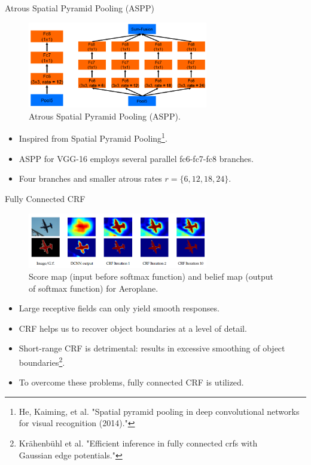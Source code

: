 \documentclass{beamer}
\begin{document}
\begin{frame}{Atrous Spatial Pyramid Pooling (ASPP)}
\vspace{-0.5cm}
\begin{figure}
	\centering
	\includegraphics[width=0.7\textwidth]{figure/ss43.png}
	\captionsetup{justification=centering}
	\caption{Atrous Spatial Pyramid Pooling (ASPP).}	
\end{figure}
\vspace{-0.4cm}
\begin{itemize}
	\item Inspired from 
	{\color{blue} Spatial Pyramid Pooling}\footnote{He, Kaiming, et al. "Spatial pyramid pooling in deep convolutional networks for visual recognition (2014)."}.
	\item<2-> ASPP for VGG-16 employs several parallel fc6-fc7-fc8 branches.
	\item<2-> Four branches and smaller atrous rates  $r=\{6,12,18,24\}$.
\end{itemize}	
\end{frame}

\begin{frame}{Fully Connected CRF}
\begin{figure}
	\centering
	\includegraphics[width=0.7\textwidth]{figure/ss26.png}
	\captionsetup{justification=centering}
	\caption{Score map (input before softmax function) and belief map (output of softmax function) for Aeroplane.}
\end{figure}
\vspace{-0.4cm}
\begin{itemize}
	\item Large receptive fields can only yield smooth responses.
	\item CRF helps us to recover object boundaries at a level of detail.
	\item<2-> Short-range CRF is detrimental: results in excessive smoothing of object boundaries\footnote{Krähenbühl et al. "Efficient inference in fully connected crfs with \\Gaussian edge potentials."}.
	\item<2-> To overcome these problems, {\color{blue}fully connected CRF} is utilized.
\end{itemize}	
\end{frame}
\end{document}
